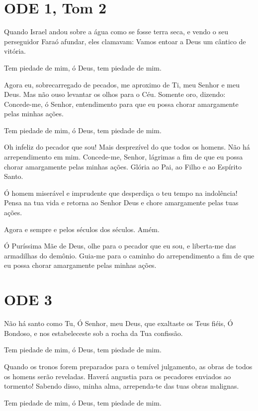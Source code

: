 \documentclass{subfiles}
\begin{document}

\section*{ODE 1, Tom 2}

\eirmos{}Quando Israel andou sobre a água como se fosse terra seca, e vendo o seu
perseguidor Faraó afundar, eles clamavam: Vamos entoar a Deus um cântico de
vitória.

Tem piedade de mim, ó Deus, tem piedade de mim.

Agora eu, sobrecarregado de pecados, me aproximo de Ti, meu Senhor e meu Deus.
Mas não ouso levantar os olhos para o Céu. Somente oro, dizendo: Concede-me, ó
Senhor, entendimento para que eu possa chorar amargamente pelas minhas ações.

Tem piedade de mim, ó Deus, tem piedade de mim.

Oh infeliz do pecador que sou! Mais desprezível do que todos os homens. Não há
arrependimento em mim. Concede-me, Senhor, lágrimas a fim de que eu possa chorar
amargamente pelas minhas ações. Glória ao Pai, ao Filho e ao Espírito Santo.

Ó homem miserável e imprudente que desperdiça o teu tempo na
indolência! Pensa na tua vida e retorna ao Senhor Deus e chore amargamente
pelas tuas ações.

Agora e sempre e pelos séculos dos séculos. Amém.

\theotokion{}Ó Puríssima Mãe de Deus, olhe para o pecador que eu sou, e
liberta-me das armadilhas do demônio. Guia-me para o caminho do arrependimento a
fim de que eu possa chorar amargamente pelas minhas ações.

\section*{ODE 3}

\eirmos{}Não há santo como Tu, Ó Senhor, meu Deus, que exaltaste os Teus fiéis,
Ó Bondoso, e nos estabeleceste sob a rocha da Tua confissão.

Tem piedade de mim, ó Deus, tem piedade de mim.

Quando os tronos forem preparados para o temível julgamento, as obras de todos
os homens serão reveladas. Haverá angustia para os pecadores enviados ao
tormento! Sabendo disso, minha alma, arrependa-te das tuas obras malignas.

Tem piedade de mim, ó Deus, tem piedade de mim.
\end{document}
